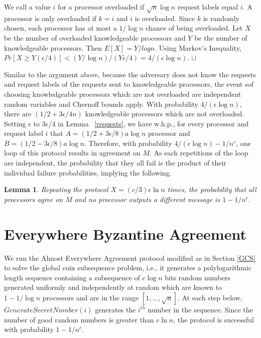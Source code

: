 \documentclass[letterpaper,11pt]{article}
\newtheorem{lemma}{Lemma}
\newcommand{\sq}{\hbox{\rlap{$\sqcap$}$\sqcup$}}
\newcommand{\qed}{\hspace*{\fill}\sq}
\newenvironment{proof}{\noindent {\bf Proof:}}{\qed\par\vskip 4mm\par}
\begin{document}
\begin{proof} 
We call a value $i$ for a processor overloaded if $\sqrt{n} \log n$ request labels equal $i$.
A processor is only overloaded if $k=i$ and $i$ is overloaded.  Since $k$ is randomly chosen, each processor has 
at most a $1/\log n$ chance of being overloaded.  Let $X$ be the number of overloaded knowledgeable processors and
$Y$ be the number of knowledgeable processors.
Then $E[X]= Y/log n$. Using Markov's Inequality, $Pr[X \geq Y(\epsilon/4)] < (Y/\log n)/( Y \epsilon/4)=4/(\epsilon \log n)$. 
\end{proof}
Similar to the argument above, because the adversary does not know the requests and request labels of the requests 
sent to knowledgeable processors, the event sof choosing knowledgeable  processors which are not overloaded are independent random variables and Chernoff bounds apply. With probability $4/(\epsilon \log n)$, there are $(1/2 + 3\epsilon/4 n)$ knowledgeable processors which are not overloaded.
Setting $\epsilon$ to $3\epsilon/4$ in Lemma~ \ref{requests},  we  have w.h.p., for every processor and request label $i$ that $A=(1/2+ 3\epsilon/8) a \log n$ processor
and $B=(1/2 - 3\epsilon/8)a \log n$.  Therefore, with probability $4 / (\epsilon \log  n) -1/n^c$, one loop of this protocol results in agreement on $M$.   As each repetitions of the loop are independent, the probability that they all fail is the product of their individual failure
probabilities, implying the following.
 
\begin{lemma}
Repeating the protocol $X=(c/3) \epsilon  \ln n $ times,  the probability that all processors agree on $M$ and no processor outputs a different message is $1-1/n^c$. 

\end{lemma}



\section{Everywhere Byzantine Agreement}
We run the Almost Everywhere Agreement  protocol modified as in Section \ref{GCS}  to solve the global coin subsequence problem, i.e., it generates a polylogarithmic length sequence containing a subsequence of  $c\log n$ bits  random numbers  generated uniformly and independently at random which are
known to $1-1/\log n$ processors and are in the range $[1,...,\sqrt n]$.
At each step below, $GenerateSecretNumber(i)$ generates the $i^{th}$ number in the sequence.  Since the number of  good
random numbers is greater than $ c  \ln n $, the protocol is successful with probability $1-1/n^c$. 
\end{document}
